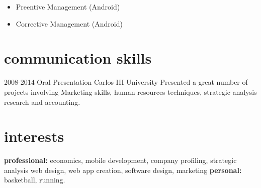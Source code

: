 \documentclass[]{friggeri-cv} %
\begin{document}
\begin{entrylist}
{\begin{itemize}
\item Preentive Management (Android)
\item Corrective Management (Android)
\end{itemize}}



\end{entrylist}



\section{communication skills}

\begin{entrylist}
\entry
{2008-2014}
{Oral Presentation}
{Carlos III University}
{Presented a great number of projects involving Marketing skills, human resources techniques, strategic analysis research and accounting.}
\end{entrylist}


\section{interests}

\textbf{professional:} economics, mobile development, company profiling, strategic analysis web design, web app creation, software design, marketing \textbf{personal:} basketball, running.
\end{document}
